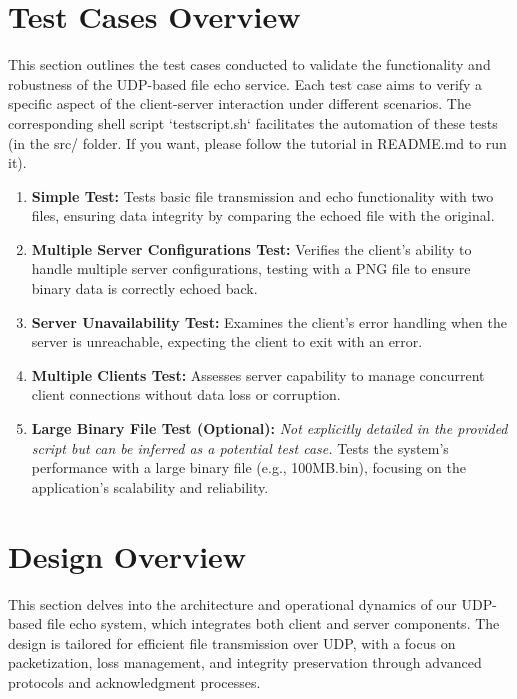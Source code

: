 \documentclass{article}
\begin{document}
\section*{Test Cases Overview}
This section outlines the test cases conducted to validate the functionality and robustness of the UDP-based file echo service. Each test case aims to verify a specific aspect of the client-server interaction under different scenarios. The corresponding shell script `testscript.sh` facilitates the automation of these tests (in the src/ folder. If you want, please follow the tutorial in README.md to run it).

\begin{enumerate}
    \item \textbf{Simple Test:}
    Tests basic file transmission and echo functionality with two files, ensuring data integrity by comparing the echoed file with the original.
    
    \item \textbf{Multiple Server Configurations Test:}
    Verifies the client's ability to handle multiple server configurations, testing with a PNG file to ensure binary data is correctly echoed back.
    
    \item \textbf{Server Unavailability Test:}
    Examines the client's error handling when the server is unreachable, expecting the client to exit with an error.
    
    \item \textbf{Multiple Clients Test:}
    Assesses server capability to manage concurrent client connections without data loss or corruption.
    
    \item \textbf{Large Binary File Test (Optional):}
    \emph{Not explicitly detailed in the provided script but can be inferred as a potential test case.} Tests the system's performance with a large binary file (e.g., 100MB.bin), focusing on the application's scalability and reliability.
\end{enumerate}

\section*{Design Overview}
This section delves into the architecture and operational dynamics of our UDP-based file echo system, which integrates both client and server components. The design is tailored for efficient file transmission over UDP, with a focus on packetization, loss management, and integrity preservation through advanced protocols and acknowledgment processes.
\end{document}
